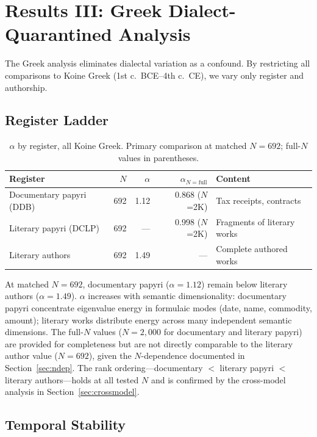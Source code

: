 \documentclass[12pt,letterpaper]{article}
\newcommand{\al}{\alpha}
\begin{document}
\section{Results III: Greek Dialect-Quarantined Analysis}
\label{sec:greek}

The Greek analysis eliminates dialectal variation as a confound.
By restricting all comparisons to Koine Greek (1st c.\ BCE--4th c.\
CE), we vary only register and authorship.

\subsection{Register Ladder}
\label{sec:register}

\begin{table}[H]
\centering
\caption{$\al$ by register, all Koine Greek.  Primary comparison
at matched $N = 692$; full-$N$ values in parentheses.}
\label{tab:register}
\begin{tabular}{lrrrl}
\toprule
\textbf{Register} & $N$ & $\al$ & $\al_{N=\text{full}}$ &
\textbf{Content} \\
\midrule
Documentary papyri (DDB) & 692 & 1.12 & 0.868 ($N$=2K) &
Tax receipts, contracts \\
Literary papyri (DCLP) & 692 & --- & 0.998 ($N$=2K) &
Fragments of literary works \\
Literary authors & 692 & 1.49 & --- &
Complete authored works \\
\bottomrule
\end{tabular}
\end{table}

At matched $N = 692$, documentary papyri ($\al = 1.12$) remain
below literary authors ($\al = 1.49$).  $\al$ increases with
semantic dimensionality: documentary papyri concentrate eigenvalue
energy in formulaic modes (date, name, commodity, amount); literary
works distribute energy across many independent semantic dimensions.
The full-$N$ values ($N = 2{,}000$ for documentary and literary
papyri) are provided for completeness but are not directly
comparable to the literary author value ($N = 692$), given the
$N$-dependence documented in Section~\ref{sec:ndep}.  The rank
ordering---documentary $<$ literary papyri $<$ literary
authors---holds at all tested $N$ and is confirmed by the
cross-model analysis in Section~\ref{sec:crossmodel}.

\subsection{Temporal Stability}
\end{document}
